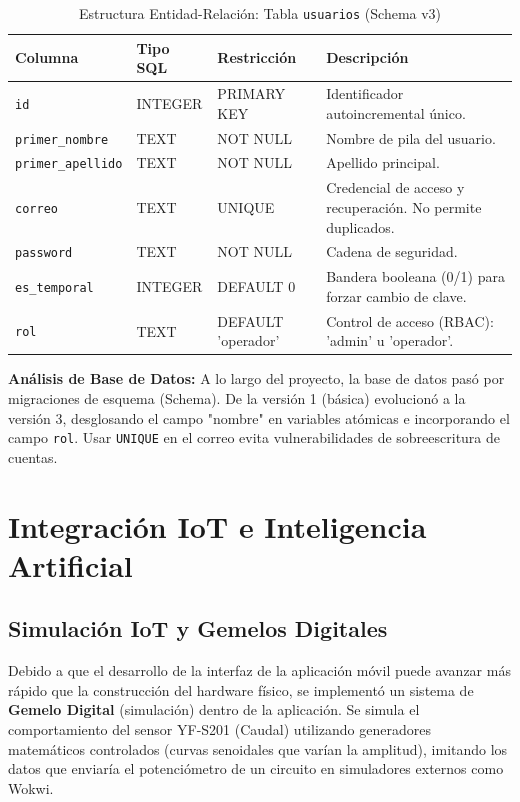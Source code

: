 \documentclass[11pt,a4paper]{article}
\begin{document}
\begin{table}[htpb]
    \centering
    \caption{Estructura Entidad-Relación: Tabla \texttt{usuarios} (Schema v3)}
    \begin{tabularx}{\textwidth}{l l l X}
        \toprule
        \textbf{Columna} & \textbf{Tipo SQL} & \textbf{Restricción} & \textbf{Descripción} \\
        \midrule
        \texttt{id} & INTEGER & PRIMARY KEY & Identificador autoincremental único. \\
        \texttt{primer\_nombre} & TEXT & NOT NULL & Nombre de pila del usuario. \\
        \texttt{primer\_apellido}& TEXT & NOT NULL & Apellido principal. \\
        \texttt{correo} & TEXT & UNIQUE & Credencial de acceso y recuperación. No permite duplicados. \\
        \texttt{password} & TEXT & NOT NULL & Cadena de seguridad. \\
        \texttt{es\_temporal} & INTEGER& DEFAULT 0 & Bandera booleana (0/1) para forzar cambio de clave.\\
        \texttt{rol} & TEXT & DEFAULT 'operador' & Control de acceso (RBAC): 'admin' u 'operador'. \\
        \bottomrule
    \end{tabularx}
\end{table}

\textbf{Análisis de Base de Datos:} A lo largo del proyecto, la base de datos pasó por migraciones de esquema (Schema). De la versión 1 (básica) evolucionó a la versión 3, desglosando el campo "nombre" en variables atómicas e incorporando el campo \texttt{rol}. Usar \texttt{UNIQUE} en el correo evita vulnerabilidades de sobreescritura de cuentas.

\section{Integración IoT e Inteligencia Artificial}

\subsection{Simulación IoT y Gemelos Digitales}

Debido a que el desarrollo de la interfaz de la aplicación móvil puede avanzar más rápido que la construcción del hardware físico, se implementó un sistema de \textbf{Gemelo Digital} (simulación) dentro de la aplicación. 
Se simula el comportamiento del sensor YF-S201 (Caudal) utilizando generadores matemáticos controlados (curvas senoidales que varían la amplitud), imitando los datos que enviaría el potenciómetro de un circuito en simuladores externos como Wokwi.
\end{document}
